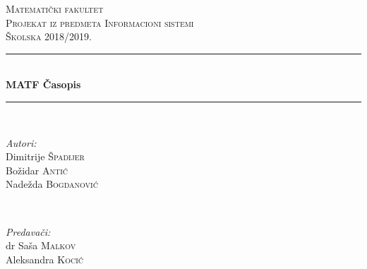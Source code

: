\documentclass[a4paper]{article}
\begin{document}
\begin{titlepage}

\newcommand{\HRule}{\rule{\linewidth}{0.5mm}} %

\center %
 

\textsc{\LARGE Matematički fakultet}\\[1.5cm] %
\textsc{\Large Projekat iz predmeta Informacioni sistemi}\\[0.5cm] %
\textsc{\large Školska 2018/2019.}\\[0.5cm] %


\HRule \\[0.4cm]
{ \huge \bfseries MATF Časopis}\\[0.4cm] %
\HRule \\[1.5cm]
 

\begin{minipage}{0.4\textwidth}
\begin{flushleft} \large
\emph{Autori:}\\
Dimitrije \textsc{Špadijer}\\
Božidar \textsc{Antić}\\
Nadežda \textsc{Bogdanović}
\end{flushleft}
\end{minipage}
~
\begin{minipage}{0.4\textwidth}
\begin{flushright} \large
\emph{Predavači:} \\
dr Saša \textsc{Malkov}\\
Aleksandra \textsc{Kocić}
\end{flushright}
\end{minipage}\\[2cm]


\end{titlepage}
\end{document}
